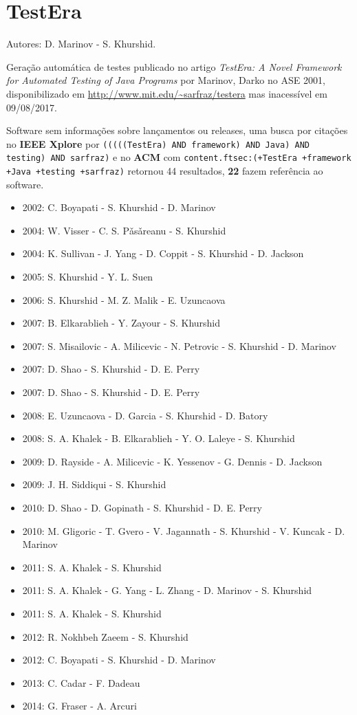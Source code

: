 \section{TestEra}

Autores:
D. Marinov - S. Khurshid.

Geração automática de testes
publicado no artigo {\it TestEra: A Novel Framework for Automated Testing of Java Programs}
por Marinov, Darko
no ASE 2001,
disponibilizado em \url{http://www.mit.edu/~sarfraz/testera}
mas inacessível em 09/08/2017.

Software sem informações sobre lançamentos ou releases,
uma busca por citações no {\bf IEEE Xplore} por
\texttt{(((((TestEra) AND framework) AND Java) AND testing) AND sarfraz)}
e no {\bf ACM} com
\texttt{content.ftsec:(+TestEra +framework +Java +testing +sarfraz)}
retornou
44 resultados,
{\bf 22} fazem referência ao software.

\begin{itemize}
\item 2002: C. Boyapati - S. Khurshid - D. Marinov
\item 2004: W. Visser - C. S. P\v{a}s\v{a}reanu - S. Khurshid
\item 2004: K. Sullivan - J. Yang - D. Coppit - S. Khurshid - D. Jackson
\item 2005: S. Khurshid - Y. L. Suen
\item 2006: S. Khurshid - M. Z. Malik - E. Uzuncaova
\item 2007: B. Elkarablieh - Y. Zayour - S. Khurshid
\item 2007: S. Misailovic - A. Milicevic - N. Petrovic - S. Khurshid - D. Marinov
\item 2007: D. Shao - S. Khurshid - D. E. Perry
\item 2007: D. Shao - S. Khurshid - D. E. Perry
\item 2008: E. Uzuncaova - D. Garcia - S. Khurshid - D. Batory
\item 2008: S. A. Khalek - B. Elkarablieh - Y. O. Laleye - S. Khurshid
\item 2009: D. Rayside - A. Milicevic - K. Yessenov - G. Dennis - D. Jackson
\item 2009: J. H. Siddiqui - S. Khurshid
\item 2010: D. Shao - D. Gopinath - S. Khurshid - D. E. Perry
\item 2010: M. Gligoric - T. Gvero - V. Jagannath - S. Khurshid - V. Kuncak - D. Marinov
\item 2011: S. A. Khalek - S. Khurshid
\item 2011: S. A. Khalek - G. Yang - L. Zhang - D. Marinov - S. Khurshid
\item 2011: S. A. Khalek - S. Khurshid
\item 2012: R. Nokhbeh Zaeem - S. Khurshid
\item 2012: C. Boyapati - S. Khurshid - D. Marinov
\item 2013: C. Cadar - F. Dadeau
\item 2014: G. Fraser - A. Arcuri
\end{itemize}

